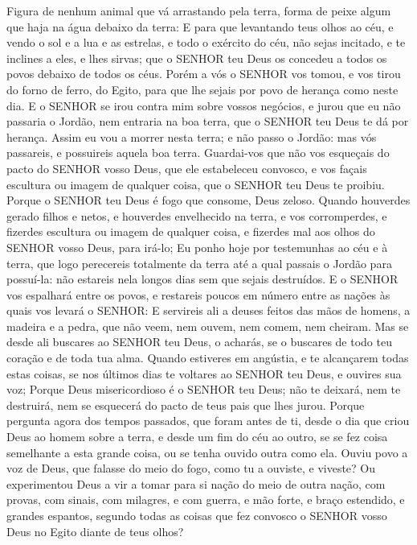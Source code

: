 {{  Figura de nenhum animal que vá arrastando pela terra, forma de peixe algum que haja na água debaixo da terra:
  E para que levantando teus olhos ao céu, e vendo o sol e a lua e as estrelas, e todo o exército do céu, não sejas incitado, e te inclines a eles, e lhes sirvas; que o SENHOR teu Deus os concedeu a todos os povos debaixo de todos os céus.
  Porém a vós o SENHOR vos tomou, e vos tirou do forno de ferro, do Egito, para que lhe sejais por povo de herança como neste dia.
  E o SENHOR se irou contra mim sobre vossos negócios, e jurou que eu não passaria o Jordão, nem entraria na boa terra, que o SENHOR teu Deus te dá por herança.
  Assim eu vou a morrer nesta terra; e não passo o Jordão: mas vós passareis, e possuireis aquela boa terra.
  Guardai-vos que não vos esqueçais do pacto do SENHOR vosso Deus, que ele estabeleceu convosco, e vos façais escultura ou imagem de qualquer coisa, que o SENHOR teu Deus te proibiu.
  Porque o SENHOR teu Deus é fogo que consome, Deus zeloso.
  Quando houverdes gerado filhos e netos, e houverdes envelhecido na terra, e vos corromperdes, e fizerdes escultura ou imagem de qualquer coisa, e fizerdes mal aos olhos do SENHOR vosso Deus, para irá-lo;
  Eu ponho hoje por testemunhas ao céu e à terra, que logo perecereis totalmente da terra até a qual passais o Jordão para possuí-la: não estareis nela longos dias sem que sejais destruídos.
  E o SENHOR vos espalhará entre os povos, e restareis poucos em número entre as nações às quais vos levará o SENHOR:
  E servireis ali a deuses feitos das mãos de homens, a madeira e a pedra, que não veem, nem ouvem, nem comem, nem cheiram. %
  Mas se desde ali buscares ao SENHOR teu Deus, o acharás, se o buscares de todo teu coração e de toda tua alma.
  Quando estiveres em angústia, e te alcançarem todas estas coisas, se nos últimos dias te voltares ao SENHOR teu Deus, e ouvires sua voz;
  Porque Deus misericordioso é o SENHOR teu Deus; não te deixará, nem te destruirá, nem se esquecerá do pacto de teus pais que lhes jurou.
  Porque pergunta agora dos tempos passados, que foram antes de ti, desde o dia que criou Deus ao homem sobre a terra, e desde um fim do céu ao outro, se se fez coisa semelhante a esta grande coisa, ou se tenha ouvido outra como ela.
  Ouviu povo a voz de Deus, que falasse do meio do fogo, como tu a ouviste, e viveste?
  Ou experimentou Deus a vir a tomar para si nação do meio de outra nação, com provas, com sinais, com milagres, e com guerra, e mão forte, e braço estendido, e grandes espantos, segundo todas as coisas que fez convosco o SENHOR vosso Deus no Egito diante de teus olhos?
}}
